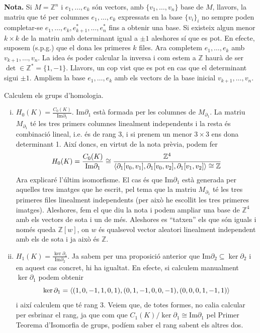\documentclass[../main.tex]{subfiles}
\begin{document}
\begin{ej}
\begin{enumerate}[(1)]
    \textbf{Nota.} Si $M = \mathbb{Z}^n$ i $e_1,\ldots,e_k$ són vectors, amb $\{v_1,\ldots,v_n\}$ base de $M$, llavors, la matriu que té per columnes $e_1,\ldots,e_k$ expressats en la base $\{v_i\}_i$ no sempre poden completar-se $e_1,\ldots,e_k,e_{k+1}^*,\ldots,e_n^*$ fins a obtenir una base. Si existeix algun menor $k\times k$ de la matriu amb determinant igual a $\pm1$ aleshores sí que es pot. En efecte, suposem (s.p.g.) que el dona les primeres $k$ files. Ara completem $e_1,\ldots,e_k$ amb $v_{k+1},\ldots,v_n$. La idea és poder calcular la inversa i com estem a $\mathbb{Z}$ haurà de ser $\det \in\mathbb{Z}^* = \{1,-1\}$. Llavors, un cop vist que es pot en cas que el determinant sigui $\pm 1$. Ampliem la base $e_1,\ldots,e_k$ amb els vectors de la base inicial $v_{k+1},\ldots,v_n$. 
    
    Calculem els grups d'homologia.
    \begin{enumerate}[(i)]
        \item $H_0(K) = \frac{C_0(K)}{\mathrm{Im}\partial_1}$. $\mathrm{Im}\partial_1$ està formada per les columnes de $M_{\partial_1}$. La matriu $M_{\partial_1}$ té les tres primers columnes linealment independents i la resta és combinació lineal, i.e. és de rang 3, i si prenem un menor $3\times 3$ ens dona determinant 1. Així doncs, en virtut de la nota prèvia, podem fer
        \begin{equation}
            \notag
            H_0(K) = \frac{C_0(K)}{\mathrm{Im}\partial_1}\cong\frac{\mathbb{Z}^4}{\langle\partial_1[v_0,v_1],\partial_1[v_0,v_2],\partial_1[v_1,v_2]\rangle\cong \mathbb{Z}}
        \end{equation}
        Ara explicaré l'últim isomorfisme. El cas és que $\mathrm{Im}\partial_1$ està generada per aquelles tres imatges que he escrit, pel tema que la matriu $M_{\partial_1}$ té les tres primeres files linealment independents (per això he escollit les tres primeres imatges). Aleshores, fem el que diu la nota i podem ampliar una base de $\mathbb{Z}^4$ amb els vectors de sota i un de més. Aleshores es ``tatxen'' els que són iguals i només queda $\mathbb{Z}[w]$, on $w$ és qualsevol vector aleatori linealment independent amb els de sota i ja això és $\mathbb{Z}$.
        
        \item $H_1(K) = \frac{\ker\partial_1}{\mathrm{Im}\partial_2}$. Ja sabem per una proposició anterior que $\mathrm{Im}\partial_2\subseteq \ker\partial_2$ i en aquest cas concret, hi ha igualtat. En efecte, si calculem manualment $\ker\partial_1$ podem obtenir
        \begin{equation}
            \notag
            \ker\partial_1 = \langle (1,0,-1,1,0,1),(0,1,-1,0,0,-1),(0,0,0,1,-1,1)\rangle
        \end{equation}
        i així calculem que té rang 3. Veiem que, de totes formes, no calia calcular per esbrinar el rang, ja que com que $C_1(K)/\ker\partial_1 \cong \mathrm{Im}\partial_1$ pel Primer Teorema d'Isomorfia de grups, podíem saber el rang sabent els altres dos.
        

\end{enumerate}
\end{enumerate}
\end{ej}
\end{document}
